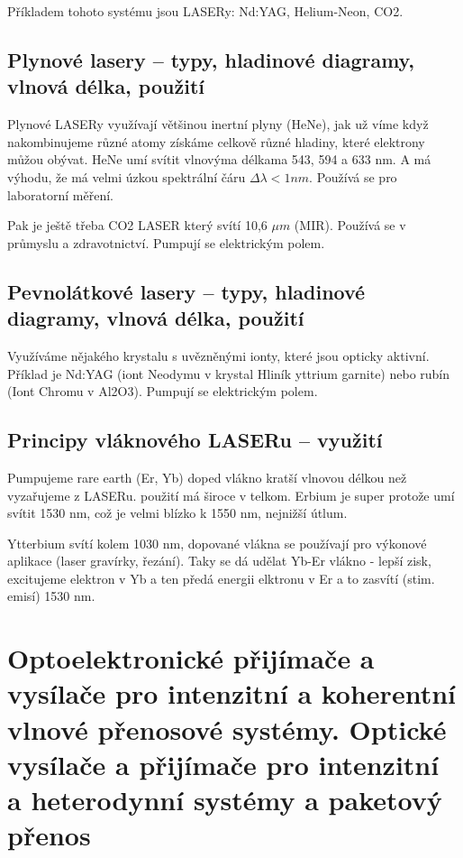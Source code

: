 \documentclass[a4paper, 12pt]{article}
\begin{document}
            Příkladem tohoto systému jsou LASERy: Nd:YAG, Helium-Neon, CO2.

        \subsection{Plynové lasery – typy, hladinové diagramy, vlnová délka, použití}
            Plynové LASERy využívají většinou inertní plyny (HeNe), jak už víme
            když nakombinujeme různé atomy získáme celkově různé hladiny, které elektrony můžou obývat.
            HeNe umí svítit vlnovýma délkama 543, 594 a 633 nm. A má výhodu, že má velmi úzkou spektrální čáru $\Delta \lambda < 1 nm$.
            Používá se pro laboratorní měření.

            Pak je ještě třeba CO2 LASER který svítí 10,6 $\mu m$ (MIR). Používá se v průmyslu a zdravotnictví.
            Pumpují se elektrickým polem.
        \subsection{Pevnolátkové lasery – typy, hladinové diagramy, vlnová délka, použití}
            Využíváme nějakého krystalu s uvězněnými ionty, které jsou opticky aktivní.
            Příklad je Nd:YAG (iont Neodymu v krystal Hliník yttrium garnite) nebo rubín (Iont Chromu v Al2O3).
            Pumpují se elektrickým polem.
        \subsection{Principy vláknového LASERu – využití}
            Pumpujeme rare earth (Er, Yb) doped vlákno kratší vlnovou délkou než vyzařujeme z LASERu.
            použití má široce v telkom. Erbium je super protože umí svítit 1530 nm, což je velmi blízko k 1550 nm, nejnižší útlum.
            
            Ytterbium svítí kolem 1030 nm, dopované vlákna se používají pro výkonové aplikace (laser gravírky, řezání).
            Taky se dá udělat Yb-Er vlákno - lepší zisk, excitujeme elektron v Yb a ten předá energii elktronu v Er a to zasvítí (stim. emisí) 1530 nm. 
            
    \section{Optoelektronické přijímače a vysílače pro intenzitní a koherentní vlnové přenosové systémy. Optické vysílače a přijímače pro intenzitní a heterodynní systémy a paketový přenos}
\end{document}
